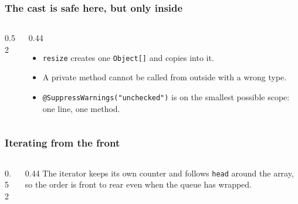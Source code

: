 \documentclass[aspectratio=169,10pt,compress]{beamer}
\begin{document}
\begin{frame}[t,fragile] \frametitle{The cast is safe here, but only inside}
  \begin{columns}[T]
    \begin{column}{0.52\textwidth}
    \end{column}
    \begin{column}{0.44\textwidth}
      \begin{itemize}\small
        \item \texttt{resize} creates one \texttt{Object[]} and copies into it.
        \item A private method cannot be called from outside with a wrong type.
        \item \texttt{@SuppressWarnings("unchecked")} is on the smallest possible scope: one line, one method.
      \end{itemize}
    \end{column}
  \end{columns}
\end{frame}




\begin{frame}[t,fragile] \frametitle{Iterating from the front}
  \begin{columns}[T]
    \begin{column}{0.52\textwidth}
    \end{column}
    \begin{column}{0.44\textwidth}
      \small The iterator keeps its own counter and follows \texttt{head} around the array, so the order is front to rear even when the queue has wrapped.\\[0.3em]
    \end{column}
  \end{columns}
\end{frame}

\end{document}
